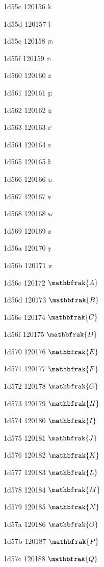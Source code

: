 \documentclass[11pt]{article}
\begin{document}
1d55c 120156 \ensuremath{\mathbb{k}}

1d55d 120157 \ensuremath{\mathbb{l}}

1d55e 120158 \ensuremath{\mathbb{m}}

1d55f 120159 \ensuremath{\mathbb{n}}

1d560 120160 \ensuremath{\mathbb{o}}

1d561 120161 \ensuremath{\mathbb{p}}

1d562 120162 \ensuremath{\mathbb{q}}

1d563 120163 \ensuremath{\mathbb{r}}

1d564 120164 \ensuremath{\mathbb{s}}

1d565 120165 \ensuremath{\mathbb{t}}

1d566 120166 \ensuremath{\mathbb{u}}

1d567 120167 \ensuremath{\mathbb{v}}

1d568 120168 \ensuremath{\mathbb{w}}

1d569 120169 \ensuremath{\mathbb{x}}

1d56a 120170 \ensuremath{\mathbb{y}}

1d56b 120171 \ensuremath{\mathbb{z}}

1d56c 120172 \ensuremath{\mathbfrak{A}}

1d56d 120173 \ensuremath{\mathbfrak{B}}

1d56e 120174 \ensuremath{\mathbfrak{C}}

1d56f 120175 \ensuremath{\mathbfrak{D}}

1d570 120176 \ensuremath{\mathbfrak{E}}

1d571 120177 \ensuremath{\mathbfrak{F}}

1d572 120178 \ensuremath{\mathbfrak{G}}

1d573 120179 \ensuremath{\mathbfrak{H}}

1d574 120180 \ensuremath{\mathbfrak{I}}

1d575 120181 \ensuremath{\mathbfrak{J}}

1d576 120182 \ensuremath{\mathbfrak{K}}

1d577 120183 \ensuremath{\mathbfrak{L}}

1d578 120184 \ensuremath{\mathbfrak{M}}

1d579 120185 \ensuremath{\mathbfrak{N}}

1d57a 120186 \ensuremath{\mathbfrak{O}}

1d57b 120187 \ensuremath{\mathbfrak{P}}

1d57c 120188 \ensuremath{\mathbfrak{Q}}
\end{document}
